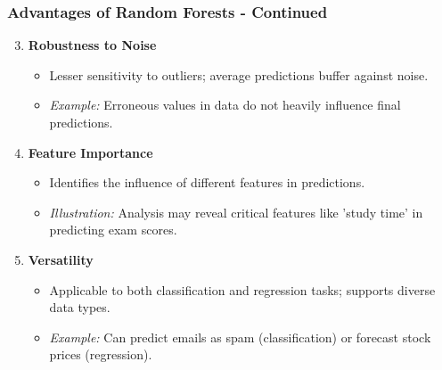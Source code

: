 \documentclass[aspectratio=169]{beamer}
\begin{document}
\begin{frame}[fragile]
    \frametitle{Advantages of Random Forests - Continued}
    \begin{enumerate}
        \setcounter{enumi}{2}
        \item \textbf{Robustness to Noise}
        \begin{itemize}
            \item Lesser sensitivity to outliers; average predictions buffer against noise.
            \item \textit{Example:} Erroneous values in data do not heavily influence final predictions.
        \end{itemize}

        \item \textbf{Feature Importance}
        \begin{itemize}
            \item Identifies the influence of different features in predictions.
            \item \textit{Illustration:} Analysis may reveal critical features like 'study time' in predicting exam scores.
        \end{itemize}

        \item \textbf{Versatility}
        \begin{itemize}
            \item Applicable to both classification and regression tasks; supports diverse data types.
            \item \textit{Example:} Can predict emails as spam (classification) or forecast stock prices (regression).
        \end{itemize}
    \end{enumerate}
\end{frame}
\end{document}
